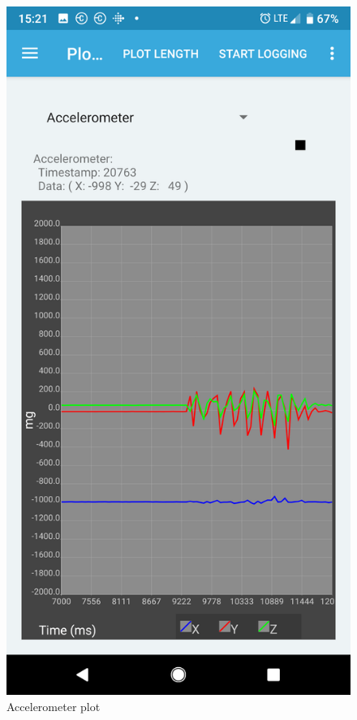 \documentclass[11pt]{article}
\numberwithin{figure}{section}
\begin{document}
\begin{figure}[H] %
\centering
\includegraphics[scale=0.3]{accel.png}
\caption{Accelerometer plot}
\label{Figure: Accelerometer}
\end{figure}
\end{document}
